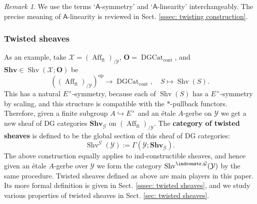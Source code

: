 \documentclass[10pt]{amsart}
\newcommand{\sssec}{\subsubsection}
\theoremstyle{remark}
\newtheorem{rmk}[subsubsection]{Remark}
\newcommand{\on}{\operatorname}
\newcommand{\cG}{\mathcal{G}}
\newcommand{\cX}{\mathcal{X}}
\newcommand{\cY}{\mathcal{Y}}
\newcommand{\DGcat}{\on{DGCat}_{\on{cont}}}
\newcommand{\Shv}{\on{Shv}}
\newcommand{\Affft}{\on{Aff}_{\on{ft}}}
\DeclareMathOperator{\op}{op}
\newcommand{\bO}{\mathbf{O}}
\newcommand{\sfA}{\mathsf{A}}
\begin{document}
\begin{rmk}
    We use the terms `$\sfA$-symmetry' and `$\sfA$-linearity' interchangeably. The precise meaning of $\sfA$-linearity is reviewed in Sect. \ref{sssec: twisting construction}.
\end{rmk}

\sssec{Twisted sheaves}\label{sssec: twisted sheaves brief}
As an example, take $\cX=(\Affft)_{/\cY}$, $\bO=\DGcat$, and $\mathbf{Shv}\in\Shv(\cX;\bO)$ be
\[\left((\Affft)_{/\cY}\right)^{\op}\rightarrow \DGcat,\quad S\mapsto \Shv(S).\]
This has a natural $E^{\times}$-symmetry, because each of $\Shv(S)$ has a $E^{\times}$-symmetry by scaling, and this structure is compatible with the $*$-pullback functors. Therefore, given a finite subgroup $A\hookrightarrow E^{\times}$ and an \'etale $A$-gerbe on $\cY$ we get a new sheaf of DG categories $\mathbf{Shv}_{\cG}$ on $(\Affft)_{/\cY}$. The \textbf{category of twisted sheaves} is defined to be the global section of this sheaf of DG categories:
\[\Shv^{\cG}(\cY):=\Gamma(\cY; \textbf{Shv}_{\cG}).\]
The above construction equally applies to ind-constructible sheaves, and hence given an \'etale $A$-gerbe over $\cY$ we form  the category $\Shv^{\indconstr,\cG}(\cY)$ by the same procedure.
Twisted sheaves defined as above are main players in this paper. Its more formal definition is given in Sect. \ref{sssec: twisted sheaves}, and we study various properties of twisted sheaves in Sect. \ref{sec: twisted sheaves}.
\end{document}
